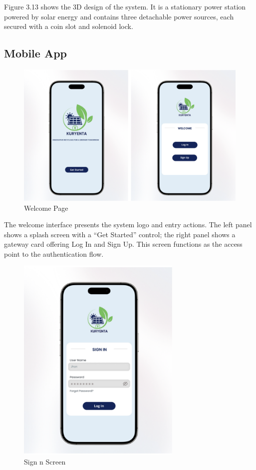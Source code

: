 {Figure 3.13 shows the 3D design of the system. It is a stationary power station powered by solar energy and contains three detachable power sources, each secured with a coin slot and solenoid lock.
  
  \subsection{Mobile App}
  
     \begin{figure}[H]
  	\centering
  	\caption{Welcome Page}
  	\label{fig:welcome}
  	\includegraphics[width=1\textwidth]{figures/welcome.png}
  \end{figure}
  
  The welcome interface presents the system logo and entry actions. The left panel shows a splash screen with a “Get Started” control; the right panel shows a gateway card offering Log In and Sign Up. This screen functions as the access point to the authentication flow.
  
   \begin{figure}[H]
  	\centering
  	\caption{Sign n Screen}
  	\label{fig:signin}
  	\includegraphics[width=0.7\textwidth]{figures/signin.png}
  \end{figure}
  
}

